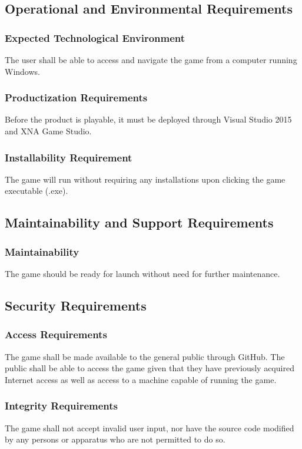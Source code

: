 \documentclass{article}
\begin{document}
\subsection{Operational and Environmental Requirements}

\subsubsection{Expected Technological Environment}
The user shall be able to access and navigate the game from a computer running Windows.

\subsubsection{Productization Requirements}
Before the product is playable, it must be deployed through Visual Studio 2015 and XNA Game Studio.

\subsubsection{Installability Requirement}
The game will run without requiring any installations upon clicking the game executable (.exe).

\subsection{Maintainability and Support Requirements}

\subsubsection{Maintainability}
The game should be ready for launch without need for further maintenance.

\subsection{Security Requirements}

\subsubsection{Access Requirements}
The game shall be made available to the general public through GitHub. The public shall be able to access the game given that they have previously acquired Internet access as well as access to a machine capable of running the game.

\subsubsection{Integrity Requirements}
The game shall not accept invalid user input, nor have the source code modified by any persons or apparatus who are not permitted to do so.
\end{document}
